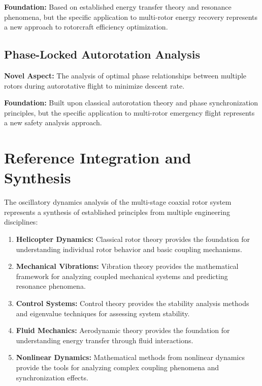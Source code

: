 \documentclass{article}
\begin{document}
\textbf{Foundation:} Based on established energy transfer theory and resonance phenomena, but the specific application to multi-rotor energy recovery represents a new approach to rotorcraft efficiency optimization.

\subsection{Phase-Locked Autorotation Analysis}

\textbf{Novel Aspect:} The analysis of optimal phase relationships between multiple rotors during autorotative flight to minimize descent rate.

\textbf{Foundation:} Built upon classical autorotation theory and phase synchronization principles, but the specific application to multi-rotor emergency flight represents a new safety analysis approach.

\section{Reference Integration and Synthesis}

The oscillatory dynamics analysis of the multi-stage coaxial rotor system represents a synthesis of established principles from multiple engineering disciplines:

\begin{enumerate}
\item \textbf{Helicopter Dynamics:} Classical rotor theory provides the foundation for understanding individual rotor behavior and basic coupling mechanisms.

\item \textbf{Mechanical Vibrations:} Vibration theory provides the mathematical framework for analyzing coupled mechanical systems and predicting resonance phenomena.

\item \textbf{Control Systems:} Control theory provides the stability analysis methods and eigenvalue techniques for assessing system stability.

\item \textbf{Fluid Mechanics:} Aerodynamic theory provides the foundation for understanding energy transfer through fluid interactions.

\item \textbf{Nonlinear Dynamics:} Mathematical methods from nonlinear dynamics provide the tools for analyzing complex coupling phenomena and synchronization effects.
\end{enumerate}
\end{document}
